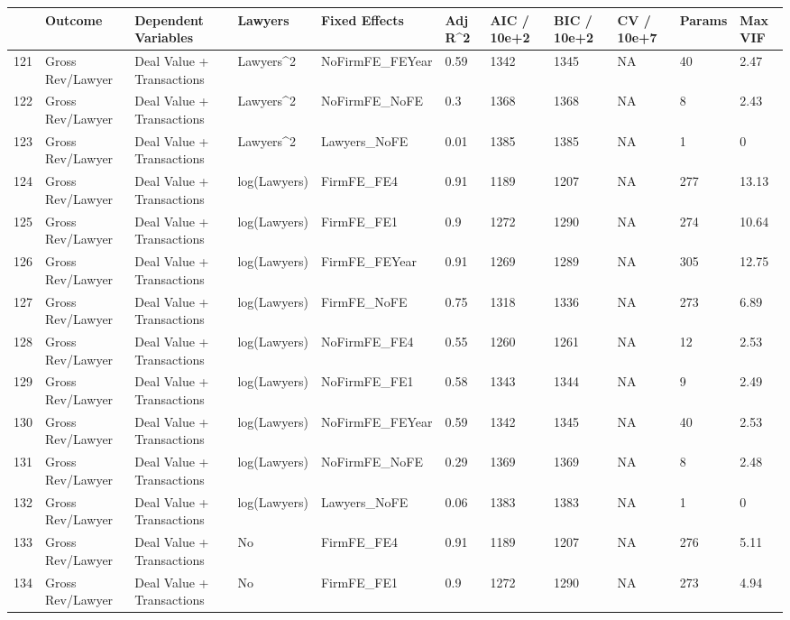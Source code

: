 \documentclass{article}
\begin{document}
\begin{table}[H]
\centering
\begin{tabular}{rllllllllll}
  \hline
 & Outcome & Dependent Variables & Lawyers & Fixed Effects & Adj R^2 & AIC / 10e+2 & BIC / 10e+2 & CV / 10e+7 & Params & Max VIF \\
  \hline
121 & Gross Rev/Lawyer & Deal Value + Transactions & Lawyers^2 & NoFirmFE\_FEYear & 0.59 & 1342 & 1345 & NA & 40 & 2.47 \\
  122 & Gross Rev/Lawyer & Deal Value + Transactions & Lawyers^2 & NoFirmFE\_NoFE & 0.3 & 1368 & 1368 & NA & 8 & 2.43 \\
  123 & Gross Rev/Lawyer & Deal Value + Transactions & Lawyers^2 & Lawyers\_NoFE & 0.01 & 1385 & 1385 & NA & 1 & 0 \\
  124 & Gross Rev/Lawyer & Deal Value + Transactions & log(Lawyers) & FirmFE\_FE4 & 0.91 & 1189 & 1207 & NA & 277 & 13.13 \\
  125 & Gross Rev/Lawyer & Deal Value + Transactions & log(Lawyers) & FirmFE\_FE1 & 0.9 & 1272 & 1290 & NA & 274 & 10.64 \\
  126 & Gross Rev/Lawyer & Deal Value + Transactions & log(Lawyers) & FirmFE\_FEYear & 0.91 & 1269 & 1289 & NA & 305 & 12.75 \\
  127 & Gross Rev/Lawyer & Deal Value + Transactions & log(Lawyers) & FirmFE\_NoFE & 0.75 & 1318 & 1336 & NA & 273 & 6.89 \\
  128 & Gross Rev/Lawyer & Deal Value + Transactions & log(Lawyers) & NoFirmFE\_FE4 & 0.55 & 1260 & 1261 & NA & 12 & 2.53 \\
  129 & Gross Rev/Lawyer & Deal Value + Transactions & log(Lawyers) & NoFirmFE\_FE1 & 0.58 & 1343 & 1344 & NA & 9 & 2.49 \\
  130 & Gross Rev/Lawyer & Deal Value + Transactions & log(Lawyers) & NoFirmFE\_FEYear & 0.59 & 1342 & 1345 & NA & 40 & 2.53 \\
  131 & Gross Rev/Lawyer & Deal Value + Transactions & log(Lawyers) & NoFirmFE\_NoFE & 0.29 & 1369 & 1369 & NA & 8 & 2.48 \\
  132 & Gross Rev/Lawyer & Deal Value + Transactions & log(Lawyers) & Lawyers\_NoFE & 0.06 & 1383 & 1383 & NA & 1 & 0 \\
  133 & Gross Rev/Lawyer & Deal Value + Transactions & No & FirmFE\_FE4 & 0.91 & 1189 & 1207 & NA & 276 & 5.11 \\
  134 & Gross Rev/Lawyer & Deal Value + Transactions & No & FirmFE\_FE1 & 0.9 & 1272 & 1290 & NA & 273 & 4.94 \\

\end{tabular}
\end{table}
\end{document}
